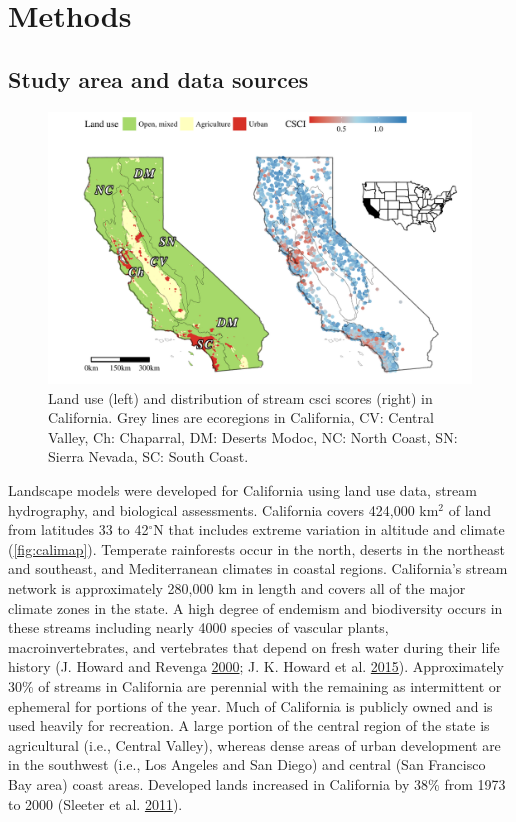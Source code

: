 \documentclass[]{article}
\begin{document}
\section{Methods}\label{methods}

\subsection{Study area and data
sources}\label{study-area-and-data-sources}

\begin{figure}
\centering
\includegraphics{figs/calimap-1.pdf}
\caption{Land use (left) and distribution of stream \ac{csci} scores
(right) in California. Grey lines are ecoregions in California, CV:
Central Valley, Ch: Chaparral, DM: Deserts Modoc, NC: North Coast, SN:
Sierra Nevada, SC: South Coast.}
\end{figure}

Landscape models were developed for California using land use data,
stream hydrography, and biological assessments. California covers
424,000 km\(^2\) of land from latitudes 33 to 42\(^\circ\)N that
includes extreme variation in altitude and climate (\cref{fig:calimap}).
Temperate rainforests occur in the north, deserts in the northeast and
southeast, and Mediterranean climates in coastal regions. California's
stream network is approximately 280,000 km in length and covers all of
the major climate zones in the state. A high degree of endemism and
biodiversity occurs in these streams including nearly 4000 species of
vascular plants, macroinvertebrates, and vertebrates that depend on
fresh water during their life history (J. Howard and Revenga
\protect\hyperlink{ref-Howard09}{2000}; J. K. Howard et al.
\protect\hyperlink{ref-Howard15}{2015}). Approximately 30\% of streams
in California are perennial with the remaining as intermittent or
ephemeral for portions of the year. Much of California is publicly owned
and is used heavily for recreation. A large portion of the central
region of the state is agricultural (i.e., Central Valley), whereas
dense areas of urban development are in the southwest (i.e., Los Angeles
and San Diego) and central (San Francisco Bay area) coast areas.
Developed lands increased in California by 38\% from 1973 to 2000
(Sleeter et al. \protect\hyperlink{ref-Sleeter11}{2011}).
\end{document}
